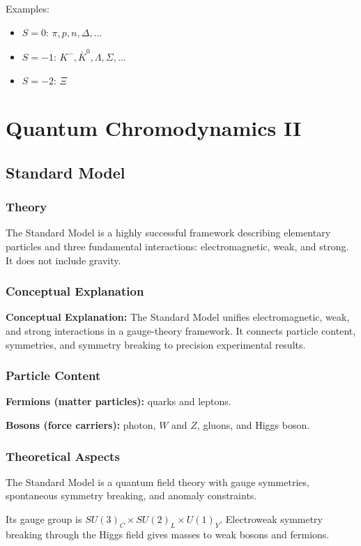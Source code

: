 \documentclass[12pt]{report}
\begin{document}
Examples:
\begin{itemize}
    \item $S=0$: $\pi, p, n, \Delta, \ldots$
    \item $S=-1$: $K^-, \bar{K}^0, \Lambda, \Sigma, \ldots$
    \item $S=-2$: $\Xi$
\end{itemize}


\chapter{Quantum Chromodynamics II}

\section{Standard Model}



\subsection{Theory}
The Standard Model is a highly successful framework describing elementary particles and three fundamental interactions: electromagnetic, weak, and strong. It does not include gravity.


\subsection{Conceptual Explanation}
\textbf{Conceptual Explanation:} The Standard Model unifies electromagnetic, weak, and strong interactions in a gauge-theory framework. It connects particle content, symmetries, and symmetry breaking to precision experimental results.


\subsection{Particle Content}
\textbf{Fermions (matter particles):} quarks and leptons.

\textbf{Bosons (force carriers):} photon, $W$ and $Z$, gluons, and Higgs boson.

\subsection{Theoretical Aspects}
The Standard Model is a quantum field theory with gauge symmetries, spontaneous symmetry breaking, and anomaly constraints.

Its gauge group is $SU(3)_C \times SU(2)_L \times U(1)_Y$. Electroweak symmetry breaking through the Higgs field gives masses to weak bosons and fermions.
\end{document}
